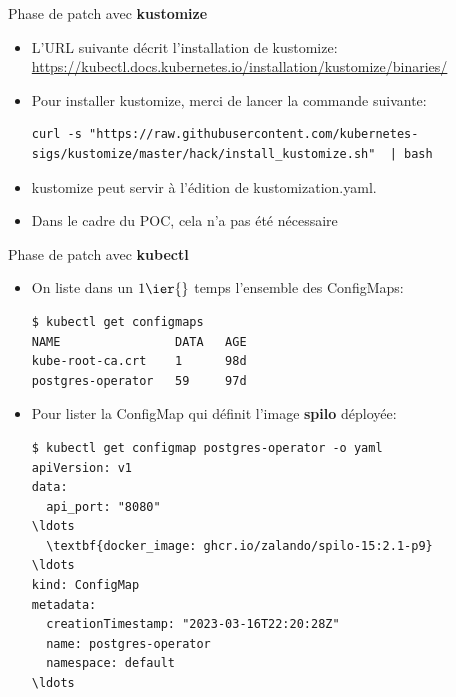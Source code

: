 \begin{frame}[fragile]{Phase de patch avec \textbf{kustomize}}

\begin{itemize}
   \item L'URL suivante décrit l'installation de kustomize: \url{https://kubectl.docs.kubernetes.io/installation/kustomize/binaries/}
   \item Pour installer kustomize, merci de lancer la commande suivante:
      \begin{tiny}
      \begin{Verbatim}[commandchars=\&\{\}]
curl -s "https://raw.githubusercontent.com/kubernetes-sigs/kustomize/master/hack/install_kustomize.sh"  | bash
      \end{Verbatim}
      \end{tiny}
   \item kustomize peut servir à l'édition de kustomization.yaml.
   \item Dans le cadre du POC, cela n'a pas été nécessaire
\end{itemize}

\end{frame}


\begin{frame}[fragile]{Phase de patch avec \textbf{kubectl}}

\begin{itemize}
   \item On liste dans un $1\ier{}$ temps l'ensemble des ConfigMaps:
      \begin{tiny}
      \begin{Verbatim}[commandchars=\&\{\}]
$ kubectl get configmaps
NAME                DATA   AGE
kube-root-ca.crt    1      98d
postgres-operator   59     97d
      \end{Verbatim}
      \end{tiny}

   \item Pour lister la ConfigMap qui définit l'image \textbf{spilo} déployée:
\begin{tiny}
\begin{Verbatim}[commandchars=\\\{\}]
$ kubectl get configmap postgres-operator -o yaml
apiVersion: v1               
data:               
  api_port: "8080"     
\ldots
  \textbf{docker_image: ghcr.io/zalando/spilo-15:2.1-p9}
\ldots
kind: ConfigMap
metadata:
  creationTimestamp: "2023-03-16T22:20:28Z"
  name: postgres-operator
  namespace: default
\ldots
\end{Verbatim}
\end{tiny}
\end{itemize}

\end{frame}

